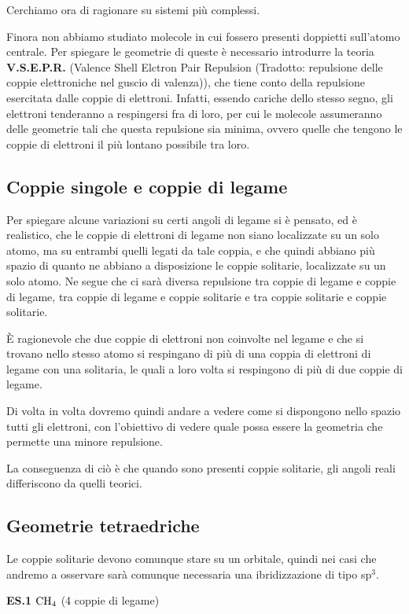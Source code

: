 Cerchiamo ora di ragionare su sistemi più complessi.

Finora non abbiamo studiato molecole in cui fossero presenti doppietti sull'atomo centrale. Per spiegare le geometrie di queste è necessario introdurre la teoria \textbf{V.S.E.P.R.} (Valence Shell Elctron Pair Repulsion (Tradotto: repulsione delle coppie elettroniche nel guscio di valenza)), che tiene conto della repulsione esercitata dalle coppie di elettroni. Infatti, essendo cariche dello stesso segno, gli elettroni tenderanno a respingersi fra di loro, per cui le molecole assumeranno delle geometrie tali che questa repulsione sia minima, ovvero quelle che tengono le coppie di elettroni il più lontano possibile tra loro.
\subsection{Coppie singole e coppie di legame}
Per spiegare alcune variazioni su certi angoli di legame si è pensato, ed è realistico, che le coppie di elettroni di legame non siano localizzate su un solo atomo, ma su entrambi quelli legati da tale coppia, e che quindi abbiano più spazio di quanto ne abbiano a disposizione le coppie solitarie, localizzate su un solo atomo. Ne segue che ci sarà diversa repulsione tra coppie di legame e coppie di legame, tra coppie di legame e coppie solitarie e tra coppie solitarie e coppie solitarie.

È ragionevole che due coppie di elettroni non coinvolte nel legame e che si trovano nello stesso atomo si respingano di più di una coppia di elettroni di legame con una solitaria, le quali a loro volta si respingono di più di due coppie di legame.

Di volta in volta dovremo quindi andare a vedere come si dispongono nello spazio tutti gli elettroni, con l'obiettivo di vedere quale possa essere la geometria che permette una minore repulsione.

La conseguenza di ciò è che quando sono presenti coppie solitarie, gli angoli reali differiscono da quelli teorici.
\subsection{Geometrie tetraedriche}
Le coppie solitarie devono comunque stare su un orbitale, quindi nei casi che andremo a osservare sarà comunque necessaria una ibridizzazione di tipo sp$^3$.

\vspace{0.2cm}\textbf{ES.1} $\rm CH_4$ (4 coppie di legame)
    

